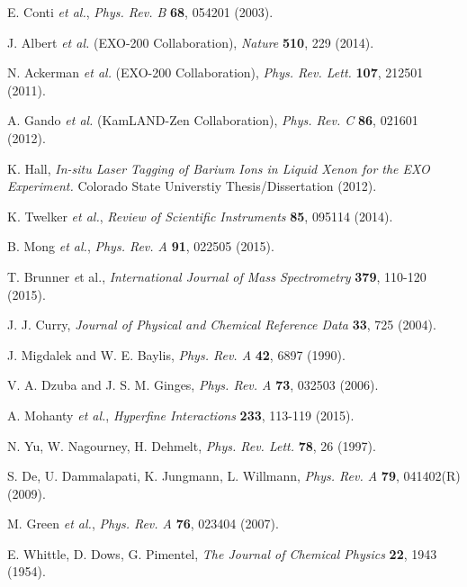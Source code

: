 \documentclass[PhD, copyrightpage]{csuthesis} %
\begin{document}
\begin{thebibliography}{00}
  E. Conti \emph{et al.}, \emph{Phys. Rev. B} \textbf{68}, 054201 (2003).
 
  J. Albert \emph{et al.} (EXO-200 Collaboration), \emph{Nature} \textbf{510}, 229 (2014).
 
  N. Ackerman \emph{et al.} (EXO-200 Collaboration), \emph{Phys. Rev. Lett.} \textbf{107}, 212501 (2011).
 
  A. Gando \emph{et al.} (KamLAND-Zen Collaboration), \emph{Phys. Rev. C} \textbf{86}, 021601 (2012).
 
  K. Hall, \emph{In-situ Laser Tagging of Barium Ions in Liquid Xenon for the EXO Experiment.}  Colorado State Universtiy Thesis/Dissertation (2012).
 
  K. Twelker \emph{et al.}, \emph{Review of Scientific Instruments} \textbf{85}, 095114 (2014).
 
  B. Mong \emph{et al.}, \emph{Phys. Rev. A} \textbf{91}, 022505 (2015).
 
  T. Brunner \emph et al., \emph{International Journal of Mass Spectrometry} \textbf{379}, 110-120 (2015).
 
 
  J. J. Curry, \emph{Journal of Physical and Chemical Reference Data} \textbf{33}, 725 (2004).

  J. Migdalek and W. E. Baylis, \emph{Phys. Rev. A} \textbf{42}, 6897 (1990).
 
  V. A. Dzuba and J. S. M. Ginges, \emph{Phys. Rev. A} \textbf{73}, 032503 (2006).
 
 
  A. Mohanty \emph{et al.}, \emph{Hyperfine Interactions} \textbf{233}, 113-119 (2015).
 
  N. Yu, W. Nagourney, H. Dehmelt, \emph{Phys. Rev. Lett.} \textbf{78}, 26 (1997).
 
  S. De, U. Dammalapati, K. Jungmann, L. Willmann, \emph{Phys. Rev. A} \textbf{79}, 041402(R) (2009).
 
  M. Green \emph{et al.}, \emph{Phys. Rev. A} \textbf{76}, 023404 (2007).
 
  E. Whittle, D. Dows, G. Pimentel, \emph{The Journal of Chemical Physics} \textbf{22}, 1943 (1954).
 

\end{thebibliography}
\end{document}
